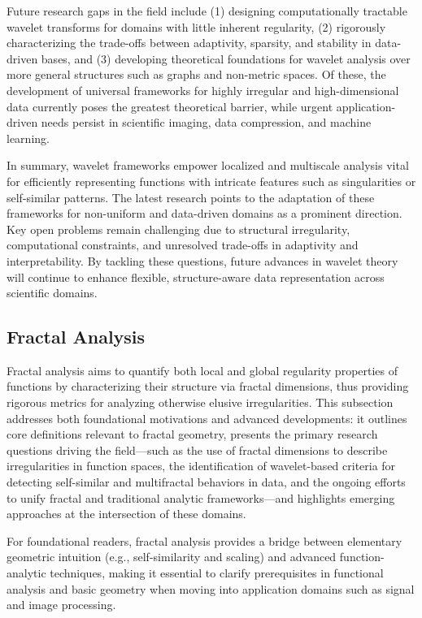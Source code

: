 \documentclass[sigconf]{acmart}
\begin{document}
Future research gaps in the field include (1) designing computationally tractable wavelet transforms for domains with little inherent regularity, (2) rigorously characterizing the trade-offs between adaptivity, sparsity, and stability in data-driven bases, and (3) developing theoretical foundations for wavelet analysis over more general structures such as graphs and non-metric spaces. Of these, the development of universal frameworks for highly irregular and high-dimensional data currently poses the greatest theoretical barrier, while urgent application-driven needs persist in scientific imaging, data compression, and machine learning.

In summary, wavelet frameworks empower localized and multiscale analysis vital for efficiently representing functions with intricate features such as singularities or self-similar patterns. The latest research points to the adaptation of these frameworks for non-uniform and data-driven domains as a prominent direction. Key open problems remain challenging due to structural irregularity, computational constraints, and unresolved trade-offs in adaptivity and interpretability. By tackling these questions, future advances in wavelet theory will continue to enhance flexible, structure-aware data representation across scientific domains.

\subsection{Fractal Analysis}

Fractal analysis aims to quantify both local and global regularity properties of functions by characterizing their structure via fractal dimensions, thus providing rigorous metrics for analyzing otherwise elusive irregularities. This subsection addresses both foundational motivations and advanced developments: it outlines core definitions relevant to fractal geometry, presents the primary research questions driving the field---such as the use of fractal dimensions to describe irregularities in function spaces, the identification of wavelet-based criteria for detecting self-similar and multifractal behaviors in data, and the ongoing efforts to unify fractal and traditional analytic frameworks---and highlights emerging approaches at the intersection of these domains.

For foundational readers, fractal analysis provides a bridge between elementary geometric intuition (e.g., self-similarity and scaling) and advanced function-analytic techniques, making it essential to clarify prerequisites in functional analysis and basic geometry when moving into application domains such as signal and image processing.
\end{document}
